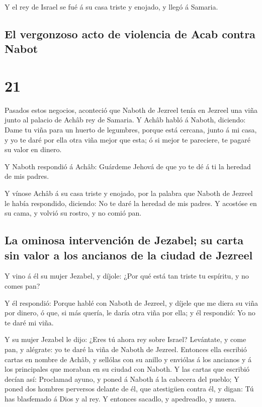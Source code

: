  Y el rey de Israel se fué á su casa triste y enojado, y
llegó á Samaria.

\hypertarget{el-vergonzoso-acto-de-violencia-de-acab-contra-nabot}{%
\subsection{El vergonzoso acto de violencia de Acab contra
Nabot}\label{el-vergonzoso-acto-de-violencia-de-acab-contra-nabot}}

\hypertarget{section-20}{%
\section{21}\label{section-20}}

 Pasados estos negocios, aconteció que Naboth de Jezreel
tenía en Jezreel una viña junto al palacio de Achâb rey de Samaria.
 Y Achâb habló á Naboth, diciendo: Dame tu viña para un
huerto de legumbres, porque está cercana, junto á mi casa, y yo te daré
por ella otra viña mejor que esta; ó si mejor te pareciere, te pagaré su
valor en dinero.

 Y Naboth respondió á Achâb: Guárdeme Jehová de que yo te
dé á ti la heredad de mis padres.

 Y vínose Achâb á su casa triste y enojado, por la palabra
que Naboth de Jezreel le había respondido, diciendo: No te daré la
heredad de mis padres. Y acostóse en su cama, y volvió su rostro, y no
comió pan.

\hypertarget{la-ominosa-intervenciuxf3n-de-jezabel-su-carta-sin-valor-a-los-ancianos-de-la-ciudad-de-jezreel}{%
\subsection{La ominosa intervención de Jezabel; su carta sin valor a los
ancianos de la ciudad de
Jezreel}\label{la-ominosa-intervenciuxf3n-de-jezabel-su-carta-sin-valor-a-los-ancianos-de-la-ciudad-de-jezreel}}

 Y vino á él su mujer Jezabel, y díjole: ¿Por qué está tan
triste tu espíritu, y no comes pan?

 Y él respondió: Porque hablé con Naboth de Jezreel, y
díjele que me diera su viña por dinero, ó que, si más quería, le daría
otra viña por ella; y él respondió: Yo no te daré mi viña.

 Y su mujer Jezabel le dijo: ¿Eres tú ahora rey sobre
Israel? Levántate, y come pan, y alégrate: yo te daré la viña de Naboth
de Jezreel.  Entonces ella escribió cartas en nombre de
Achâb, y sellólas con su anillo y enviólas á los ancianos y á los
principales que moraban en su ciudad con Naboth.  Y las
cartas que escribió decían así: Proclamad ayuno, y poned á Naboth á la
cabecera del pueblo;  Y poned dos hombres perversos
delante de él, que atestigüen contra él, y digan: Tú has blasfemado á
Dios y al rey. Y entonces sacadlo, y apedreadlo, y muera.

